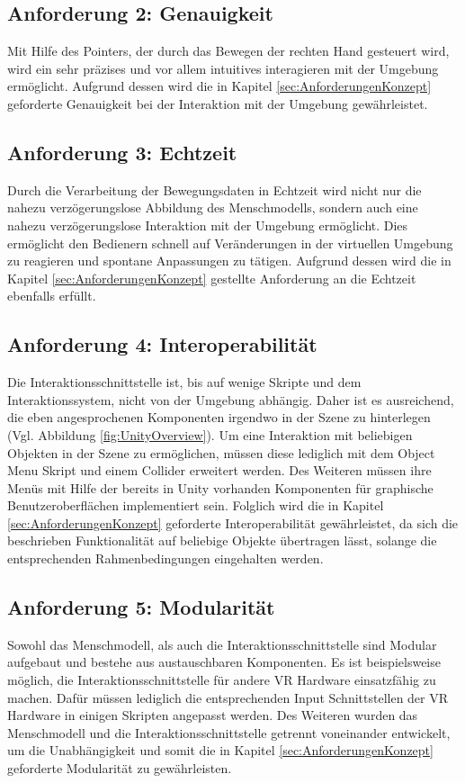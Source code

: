 \subsection{Anforderung 2: Genauigkeit}
Mit Hilfe des Pointers, der durch das Bewegen der rechten Hand gesteuert wird, wird ein sehr präzises und vor allem intuitives interagieren mit der Umgebung ermöglicht. Aufgrund dessen wird die in Kapitel \ref{sec:AnforderungenKonzept} geforderte Genauigkeit bei der Interaktion mit der Umgebung gewährleistet.

\subsection{Anforderung 3: Echtzeit}
Durch die Verarbeitung der Bewegungsdaten in Echtzeit wird nicht nur die nahezu verzögerungslose Abbildung des Menschmodells, sondern auch eine nahezu verzögerungslose Interaktion mit der Umgebung ermöglicht. Dies ermöglicht den Bedienern schnell auf Veränderungen in der virtuellen Umgebung zu reagieren und spontane Anpassungen zu tätigen. Aufgrund dessen wird die in Kapitel \ref{sec:AnforderungenKonzept} gestellte Anforderung an die Echtzeit ebenfalls erfüllt.

\subsection{Anforderung 4: Interoperabilität}
Die Interaktionsschnittstelle ist, bis auf wenige Skripte und dem Interaktionssystem, nicht von der Umgebung abhängig. Daher ist es ausreichend, die eben angesprochenen Komponenten irgendwo in der Szene zu hinterlegen (Vgl. Abbildung \ref{fig:UnityOverview}). Um eine Interaktion mit beliebigen Objekten in der Szene zu ermöglichen, müssen diese lediglich mit dem Object Menu Skript und einem Collider erweitert werden. Des Weiteren müssen ihre Menüs mit Hilfe der bereits in Unity vorhanden Komponenten für graphische Benutzeroberflächen implementiert sein. Folglich wird die in Kapitel \ref{sec:AnforderungenKonzept} geforderte Interoperabilität gewährleistet, da sich die beschrieben Funktionalität auf beliebige Objekte übertragen lässt, solange die entsprechenden Rahmenbedingungen eingehalten werden.

\subsection{Anforderung 5: Modularität}
Sowohl das Menschmodell, als auch die Interaktionsschnittstelle sind Modular aufgebaut und bestehe aus austauschbaren Komponenten. Es ist beispielsweise möglich, die Interaktionsschnittstelle für andere VR Hardware einsatzfähig zu machen. Dafür müssen lediglich die entsprechenden Input Schnittstellen der VR Hardware in einigen Skripten angepasst werden. Des Weiteren wurden das Menschmodell und die Interaktionsschnittstelle getrennt voneinander entwickelt, um die Unabhängigkeit und somit die in Kapitel \ref{sec:AnforderungenKonzept} geforderte Modularität zu gewährleisten.


